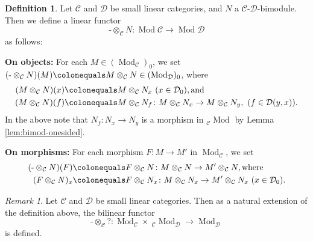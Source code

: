 \documentclass{surv-l}
\numberwithin{equation}{chapter}
\numberwithin{figure}{chapter}
\theoremstyle{plain}
\theoremstyle{definition}
\newtheorem{dfn}[thm]{Definition}
\theoremstyle{remark}
\newtheorem{rmk}[thm]{Remark}
\newcommand{\bMod}[2]{{}_{#1}\!\Mod_{#2}}
\newcommand{\llow}[1]{{}_{#1}\!}
\DeclareMathOperator{\Mod}{Mod}
\begin{document}
\begin{dfn}
Let ${\mathcal{C}}$ and ${\mathcal{D}}$ be small linear categories, and
$N$ a ${\mathcal{C}}$-${\mathcal{D}}$-bimodule.
Then we define a linear functor
\[
\text{-}\otimes_{\mathcal{C}} N \colon \Mod{\mathcal{C}} \to \Mod{\mathcal{D}}
\]
as follows:

{\bf On objects:}
For each $M \in (\Mod_{\mathcal{C}})_0$, we set
$(\text{-} \otimes_{\mathcal{C}} N)(M)\colonequals  M \otimes_{\mathcal{C}} N \in (\Mod_{\mathcal{D}})_0$,
where
\[
\begin{aligned}
(M \otimes_{\mathcal{C}} N)(x)&\colonequals  M \otimes_{\mathcal{C}} N_x\ (x \in {\mathcal{D}}_0), \text{and}\\
(M \otimes_{\mathcal{C}} N)(f)&\colonequals  M \otimes_{\mathcal{C}} N_f \colon M \otimes_{\mathcal{C}} N_x  \to M \otimes_{\mathcal{C}} N_y,\ (f \in {\mathcal{D}}(y, x)).
\end{aligned}
\]
In the above note that
$N_f \colon N_x  \to N_y$ is a morphism in $\llow{\mathcal{C}}\Mod$
by Lemma \ref{lem:bimod-onesided}.

{\bf On morphisms:}
For each morphism $F \colon M \to M'$ in $\Mod_{\mathcal{C}}$, we set
\[
\begin{aligned}
(\text{-} \otimes_{\mathcal{C}} N)(F)&\colonequals  F \otimes_{\mathcal{C}} N \colon M \otimes_{\mathcal{C}} N \to M' \otimes_{\mathcal{C}} N,
 \text{where}\\
(F \otimes_{\mathcal{C}} N)_x&\colonequals  F \otimes_{\mathcal{C}} N_x \colon M \otimes_{\mathcal{C}} N_x \to M' \otimes_{\mathcal{C}} N_x \ (x \in {\mathcal{D}}_0).
\end{aligned}
\]
\end{dfn}

\begin{rmk}
Let ${\mathcal{C}}$ and ${\mathcal{D}}$ be small linear categories.
Then as a natural extension of the definition above, the bilinear functor
\[
\text{-}\otimes_{\mathcal{C}} ? \colon \Mod_{\mathcal{C}} \times\ \bMod{\mathcal{C}}{\mathcal{D}} \to \Mod_{\mathcal{D}}
\]
is defined.
\end{rmk}
\end{document}
